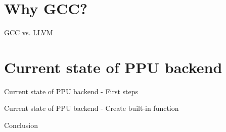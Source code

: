 \documentclass[11pt]{beamer}
\begin{document}
\section{Why GCC?}
\begin{frame}{GCC vs. LLVM}

\end{frame}

\section{Current state of PPU backend}
\begin{frame}{Current state of PPU backend - First steps}

\end{frame}

\begin{frame}{Current state of PPU backend - Create built-in function}

\end{frame}


\begin{frame}{Conclusion}

\end{frame}
\end{document}
